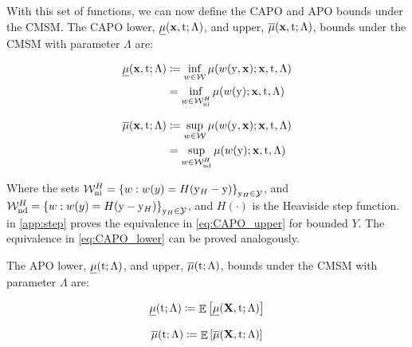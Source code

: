 With this set of functions, we can now define the CAPO and APO bounds under the CMSM.
The CAPO lower, $\underline{\mu}(\mathbf{x}, \mathrm{t}; \Lambda)$, and upper, $\overline{\mu}(\mathbf{x}, \mathrm{t}; \Lambda)$, bounds under the CMSM with parameter $\Lambda$ are:
\noindent
\begin{minipage}{.5\linewidth}
    \begin{equation}
        \label{eq:CAPO_lower}
        \begin{split}
            \underline{\mu}(\mathbf{x}, \mathrm{t}; \Lambda) 
            &\coloneqq \inf_{w \in \mathcal{W}} \mu(w(\mathrm{y}, \mathbf{x}); \mathbf{x}, \mathrm{t}, \Lambda) \\
            &= \inf_{w \in \mathcal{W}_{\textrm{ni}}^{H}} \mu(w(\mathrm{y}); \mathbf{x}, \mathrm{t}, \Lambda) 
        \end{split}
    \end{equation}
\end{minipage}%
\begin{minipage}{.5\linewidth}
    \begin{equation}
        \label{eq:CAPO_upper}
        \begin{split}
            \overline{\mu}(\mathbf{x}, \mathrm{t}; \Lambda) 
            &\coloneqq \sup_{w \in \mathcal{W}} \mu(w(\mathrm{y}, \mathbf{x}); \mathbf{x}, \mathrm{t}, \Lambda) \\
            &= \sup_{w \in \mathcal{W}_{\textrm{nd}}^{H}} \mu(w(\mathrm{y}); \mathbf{x}, \mathrm{t}, \Lambda)
        \end{split}
    \end{equation}
\end{minipage}
\break
Where the sets $\mathcal{W}_{\textrm{ni}}^{H} = \left\{ w: w(y) = H(\mathrm{y}_{H} - \mathrm{y}) \right\}_{\mathrm{y}_{H} \in \mathcal{Y}}$, and $\mathcal{W}_{\textrm{nd}}^{H} = \left\{ w: w(y) = H(\mathrm{y} - \mathrm{y}_{H})  \right\}_{\mathrm{y}_{H} \in \mathcal{Y}}$, and $H(\cdot)$ is the Heaviside step function. 
 in \cref{app:step} proves the equivalence in \cref{eq:CAPO_upper} for bounded $Y$. 
The equivalence in \cref{eq:CAPO_lower} can be proved analogously.

The APO lower, $\underline{\mu}(\mathrm{t}; \Lambda)$, and upper, $\overline{\mu}(\mathrm{t}; \Lambda)$, bounds under the CMSM with parameter $\Lambda$ are:
\noindent
\begin{minipage}{.5\linewidth}
    \begin{equation}
        \label{eq:APO_lower}
        \underline{\mu}(\mathrm{t}; \Lambda) \coloneqq \mathop{\mathbb{E}}\left[ \underline{\mu}(\mathbf{X}, \mathrm{t}; \Lambda) \right]
    \end{equation}
\end{minipage}%
\begin{minipage}{.5\linewidth}
    \begin{equation}
        \label{eq:APO_upper}
        \overline{\mu}(\mathrm{t}; \Lambda) \coloneqq \mathop{\mathbb{E}}\left[ \overline{\mu}(\mathbf{X}, \mathrm{t}; \Lambda) \right]
    \end{equation}
\end{minipage}

